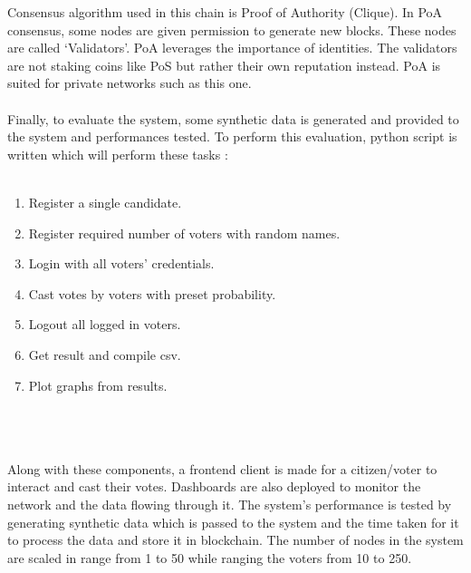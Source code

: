 \documentclass[oneside, 12pt]{book}
\begin{document}
			Consensus algorithm used in this chain is Proof of Authority (Clique). In PoA consensus, some nodes are given permission to generate new blocks. These nodes are called ‘Validators’. PoA leverages the importance of identities. The validators are not staking coins like PoS but rather their own reputation instead. PoA is suited for private networks such as this one.
			\\\\Finally, to evaluate the system, some synthetic data is generated and provided to the system and performances tested. To perform this evaluation, python script is written which will perform these tasks :
			\\\\\colorbox{gray!20}{%
		        \begin{minipage}{\linewidth}%
		            \vspace*{2pt}
		            	\begin{enumerate}
		            		\item Register a single candidate.
		            		\item Register required number of voters with random names.
		            		\item Login with all voters’ credentials.
		            		\item Cast votes by voters with preset probability.
		            		\item Logout all logged in voters.
		            		\item Get result and compile csv.
		            		\item Plot graphs from results.
		            	\end{enumerate}
		            \vspace*{2pt}
		        \end{minipage}%
		    }
		    \\\\\\Along with these components, a frontend client is made for a citizen/voter to interact and cast their votes. Dashboards are also deployed to monitor the network and the data flowing through it. The system’s performance is tested by generating synthetic data which is passed to the system and the time taken for it to process the data and store it in blockchain. The number of nodes in the system are scaled in range from 1 to 50 while ranging the voters from 10 to 250.
\end{document}
